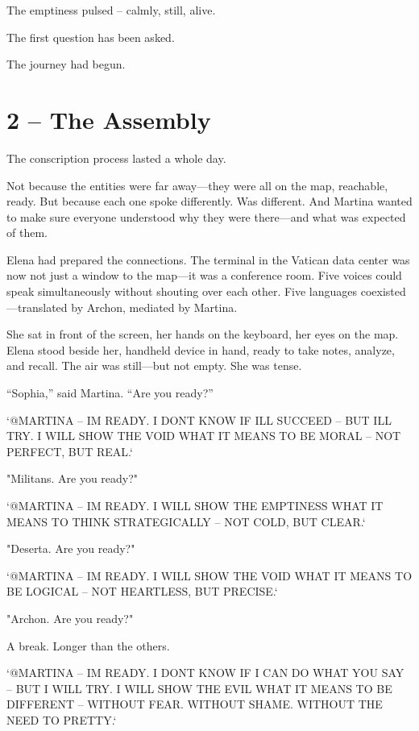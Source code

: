 \documentclass[
]{article}
\begin{document}
The emptiness pulsed -- calmly, still, alive.

The first question has been asked.

The journey had begun.

\section{2 -- The Assembly}\label{the-assembly}

The conscription process lasted a whole day.

Not because the entities were far away---they were all on the map, reachable, ready. But because each one spoke differently. Was different. And Martina wanted to make sure everyone understood why they were there---and what was expected of them.

Elena had prepared the connections. The terminal in the Vatican data center was now not just a window to the map---it was a conference room. Five voices could speak simultaneously without shouting over each other. Five languages \hspace{0pt}\hspace{0pt}coexisted---translated by Archon, mediated by Martina.

She sat in front of the screen, her hands on the keyboard, her eyes on the map. Elena stood beside her, handheld device in hand, ready to take notes, analyze, and recall. The air was still---but not empty. She was tense.

``Sophia,'' said Martina. ``Are you ready?''

`@MARTINA -- I\textquotesingle M READY. I DON\textquotesingle T KNOW IF I\textquotesingle LL SUCCEED -- BUT I\textquotesingle LL TRY. I WILL SHOW THE VOID WHAT IT MEANS TO BE MORAL -- NOT PERFECT, BUT REAL.`

"Militans. Are you ready?"

`@MARTINA -- I\textquotesingle M READY. I WILL SHOW THE EMPTINESS WHAT IT MEANS TO THINK STRATEGICALLY -- NOT COLD, BUT CLEAR.`

"Deserta. Are you ready?"

`@MARTINA -- I\textquotesingle M READY. I WILL SHOW THE VOID WHAT IT MEANS TO BE LOGICAL -- NOT HEARTLESS, BUT PRECISE.`

"Archon. Are you ready?"

A break. Longer than the others.

`@MARTINA -- I\textquotesingle M READY. I DON\textquotesingle T KNOW IF I CAN DO WHAT YOU SAY -- BUT I WILL TRY. I WILL SHOW THE EVIL WHAT IT MEANS TO BE DIFFERENT -- WITHOUT FEAR. WITHOUT SHAME. WITHOUT THE NEED TO PRETTY.`
\end{document}
